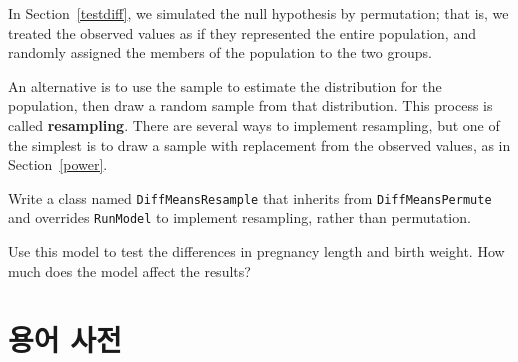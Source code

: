 \begin{exercise}

In Section~\ref{testdiff}, we simulated the null hypothesis by
permutation; that is, we treated the observed values as if they
represented the entire population, and randomly assigned the
members of the population to the two groups.

An alternative is to use the sample to estimate the distribution for
the population, then draw a random sample from that distribution.
This process is called {\bf resampling}.  There are several ways to
implement resampling, but one of the simplest is to draw a sample
with replacement from the observed values, as in Section~\ref{power}.

Write a class named {\tt DiffMeansResample} that inherits from
{\tt DiffMeansPermute} and overrides {\tt RunModel} to implement
resampling, rather than permutation.

Use this model to test the differences in pregnancy length and
birth weight.  How much does the model affect the results?

\end{exercise}


\section{용어 사전}

